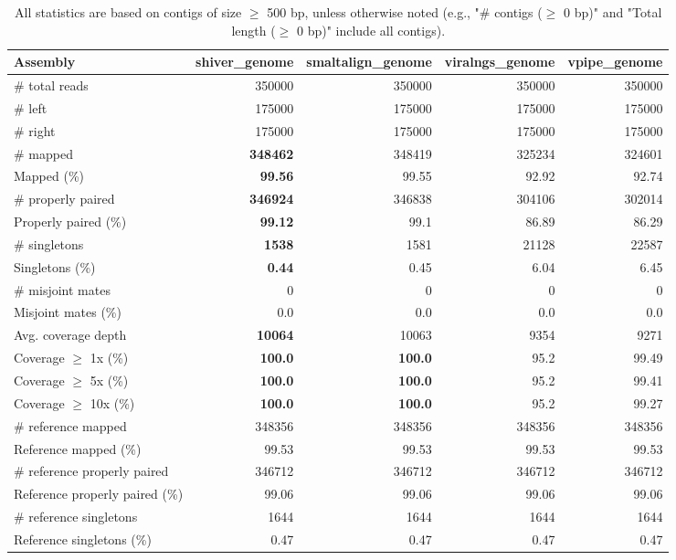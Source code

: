 \documentclass[12pt,a4paper]{article}
\begin{document}
\begin{table}[ht]
\begin{center}
\caption{All statistics are based on contigs of size $\geq$ 500 bp, unless otherwise noted (e.g., "\# contigs ($\geq$ 0 bp)" and "Total length ($\geq$ 0 bp)" include all contigs).}
\begin{tabular}{|l*{4}{|r}|}
\hline
Assembly & shiver\_genome & smaltalign\_genome & viralngs\_genome & vpipe\_genome \\ \hline
\# total reads & 350000 & 350000 & 350000 & 350000 \\ \hline
\# left & 175000 & 175000 & 175000 & 175000 \\ \hline
\# right & 175000 & 175000 & 175000 & 175000 \\ \hline
\# mapped & {\bf 348462} & 348419 & 325234 & 324601 \\ \hline
Mapped (\%) & {\bf 99.56} & 99.55 & 92.92 & 92.74 \\ \hline
\# properly paired & {\bf 346924} & 346838 & 304106 & 302014 \\ \hline
Properly paired (\%) & {\bf 99.12} & 99.1 & 86.89 & 86.29 \\ \hline
\# singletons & {\bf 1538} & 1581 & 21128 & 22587 \\ \hline
Singletons (\%) & {\bf 0.44} & 0.45 & 6.04 & 6.45 \\ \hline
\# misjoint mates & 0 & 0 & 0 & 0 \\ \hline
Misjoint mates (\%) & 0.0 & 0.0 & 0.0 & 0.0 \\ \hline
Avg. coverage depth & {\bf 10064} & 10063 & 9354 & 9271 \\ \hline
Coverage $\geq$ 1x (\%) & {\bf 100.0} & {\bf 100.0} & 95.2 & 99.49 \\ \hline
Coverage $\geq$ 5x (\%) & {\bf 100.0} & {\bf 100.0} & 95.2 & 99.41 \\ \hline
Coverage $\geq$ 10x (\%) & {\bf 100.0} & {\bf 100.0} & 95.2 & 99.27 \\ \hline
\# reference mapped & 348356 & 348356 & 348356 & 348356 \\ \hline
Reference mapped (\%) & 99.53 & 99.53 & 99.53 & 99.53 \\ \hline
\# reference properly paired & 346712 & 346712 & 346712 & 346712 \\ \hline
Reference properly paired (\%) & 99.06 & 99.06 & 99.06 & 99.06 \\ \hline
\# reference singletons & 1644 & 1644 & 1644 & 1644 \\ \hline
Reference singletons (\%) & 0.47 & 0.47 & 0.47 & 0.47 \\ \hline

\end{tabular}
\end{center}
\end{table}
\end{document}
